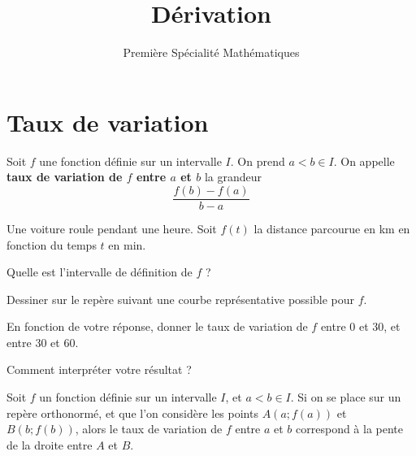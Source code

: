 \documentclass{article}
\title{Dérivation}
\author{Première Spécialité Mathématiques}
\date{}
\begin{document}
\maketitle
\section{Taux de variation}
\begin{tcolorbox}
\begin{definition}
Soit $f$ une fonction définie sur un intervalle $I$. On prend $a < b \in I$. On appelle \textbf{taux de variation de $f$ entre $a$ et $b$} la grandeur
\begin{equation*}
\dfrac{f(b)-f(a)}{b-a}
\end{equation*}
\end{definition}
\end{tcolorbox}
\begin{example}
Une voiture roule pendant une heure. Soit $f(t)$ la distance parcourue en \unit{\kilo\meter} en fonction du temps $t$ en \unit{\minute}.
\begin{enumquestions}
\item Quelle est l'intervalle de définition de $f$ ? \answersline
\item Dessiner sur le repère suivant une courbe représentative possible pour $f$.
\begin{center}
\end{center}
\item En fonction de votre réponse, donner le taux de variation de $f$ entre $0$ et $30$, et entre $30$ et $60$.
\vspace*{0.2cm}

\emptybox{2cm}
\item Comment interpréter votre résultat ? \answersline
\end{enumquestions}
\end{example}
\newpage
\begin{tcolorbox}
\begin{proposition}
Soit $f$ un fonction définie sur un intervalle $I$, et $a < b \in I$. Si on se place sur un repère orthonormé, et que l'on considère les points $A(a;f(a))$ et $B(b;f(b))$, alors le taux de variation de $f$ entre $a$ et $b$ correspond à la pente de la droite entre $A$ et $B$. 
\end{proposition}
\end{tcolorbox}
\end{document}
